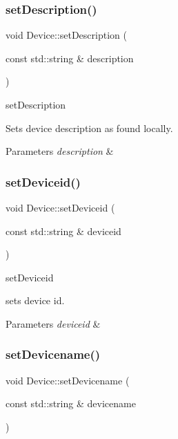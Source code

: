 \subsubsection{\texorpdfstring{set\+Description()}{setDescription()}}
{\footnotesize\ttfamily void Device\+::set\+Description (\begin{DoxyParamCaption}\item[{const std\+::string \&}]{description }\end{DoxyParamCaption})}



set\+Description 

Sets device description as found locally. 
\begin{DoxyParams}{Parameters}
{\em description} & \\
\hline
\end{DoxyParams}
\mbox{\label{classDevice_a8bd16b3e099e864db3c09ba4f6225fb0}} 
\subsubsection{\texorpdfstring{set\+Deviceid()}{setDeviceid()}}
{\footnotesize\ttfamily void Device\+::set\+Deviceid (\begin{DoxyParamCaption}\item[{const std\+::string \&}]{deviceid }\end{DoxyParamCaption})}



set\+Deviceid 

sets device id. 
\begin{DoxyParams}{Parameters}
{\em deviceid} & \\
\hline
\end{DoxyParams}
\mbox{\label{classDevice_ad1f6005dcab32855477814fa9533315d}} 
\subsubsection{\texorpdfstring{set\+Devicename()}{setDevicename()}}
{\footnotesize\ttfamily void Device\+::set\+Devicename (\begin{DoxyParamCaption}\item[{const std\+::string \&}]{devicename }\end{DoxyParamCaption})}




